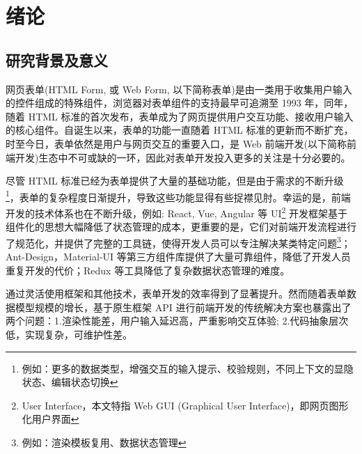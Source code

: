 \documentclass[winfonts,master,twoside]{njuthesis}
\begin{document}
\listoffigures

\listoftables

\mainmatter

\chapter{绪论}\label{chapter_introduction}

\section{研究背景及意义}

网页表单(HTML Form, 或 Web Form, 以下简称表单)是由一类用于收集用户输入的控件组成的特殊组件，浏览器对表单组件的支持最早可追溯至 1993 年\cite{html-history}，同年，随着 HTML 标准的首次发布，表单成为了网页提供用户交互功能、接收用户输入的核心组件。自诞生以来，表单的功能一直随着 HTML 标准的更新而不断扩充\cite{web-forms}，时至今日，表单依然是用户与网页交互的重要入口，是 Web 前端开发(以下简称前端开发)生态中不可或缺的一环，因此对表单开发投入更多的关注是十分必要的\cite{10.1145/2556288.2557265}。

尽管 HTML 标准已经为表单提供了大量的基础功能，但是由于需求的不断升级\footnote{例如：更多的数据类型，增强交互的输入提示、校验规则，不同上下文的显隐状态、编辑状态切换}，表单的复杂程度日渐提升，导致这些功能显得有些捉襟见肘。幸运的是，前端开发的技术体系也在不断升级，例如: React\cite{reactjs}, Vue\cite{vuejs}, Angular\cite{angularjs} 等 UI\footnote[1]{User Interface，本文特指 Web GUI (Graphical User Interface)，即网页图形化用户界面} 开发框架基于组件化的思想大幅降低了状态管理的成本，更重要的是，它们对前端开发流程进行了规范化，并提供了完整的工具链，使得开发人员可以专注解决某类特定问题\cite{wohlgethan2018supportingweb}\footnote{例如：渲染模板复用、数据状态管理}；Ant-Design\cite{ant-design}，Material-UI\cite{material-ui} 等第三方组件库提供了大量可靠组件，降低了开发人员重复开发的代价\cite{UI-libraries}；Redux 等工具降低了复杂数据状态管理的难度\cite{banks2017learning}。

通过灵活使用框架和其他技术，表单开发的效率得到了显著提升。然而随着表单数据模型规模的增长，基于原生框架 API 进行前端开发的传统解决方案也暴露出了两个问题：1.渲染性能差，用户输入延迟高，严重影响交互体验; 2.代码抽象层次低，实现复杂，可维护性差。
\end{document}
